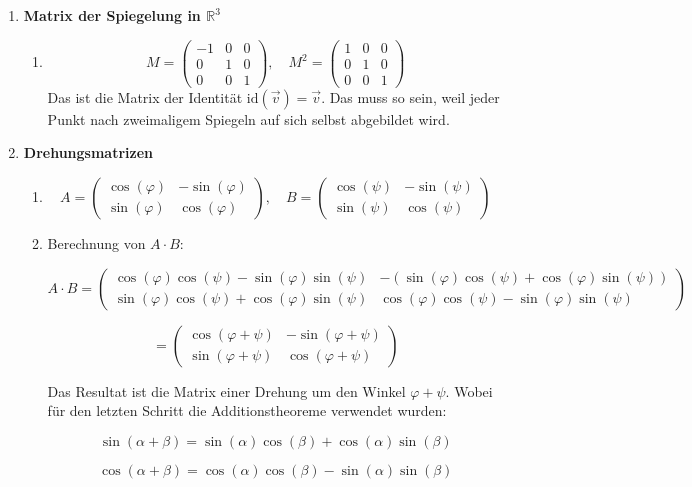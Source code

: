 \begin{enumerate}
    \item \textbf{Matrix der Spiegelung in \( \mathbb{R}^3 \)}
    \begin{enumerate}
        \item \[
        M = \begin{pmatrix} -1 & 0 & 0 \\ 0 & 1 & 0 \\ 0 & 0 & 1 \end{pmatrix}, 
        \quad M^2 = \begin{pmatrix} 1 & 0 & 0 \\ 0 & 1 & 0 \\ 0 & 0 & 1 \end{pmatrix}
        \]
        Das ist die Matrix der Identität \( \text{id}(\vec{v}) = \vec{v} \). Das muss so sein, weil jeder Punkt nach zweimaligem Spiegeln auf sich selbst abgebildet wird.
    \end{enumerate}

    \item \textbf{Drehungsmatrizen}
    \begin{enumerate}
        \item \[
        A = \begin{pmatrix} \cos(\varphi) & -\sin(\varphi) \\ \sin(\varphi) & \cos(\varphi) \end{pmatrix}, 
        \quad B = \begin{pmatrix} \cos(\psi) & -\sin(\psi) \\ \sin(\psi) & \cos(\psi) \end{pmatrix}
        \]

        \item Berechnung von \( A \cdot B \):

        \[
        A \cdot B =
        \begin{pmatrix} 
        \cos(\varphi) \cos(\psi) - \sin(\varphi) \sin(\psi) & -(\sin(\varphi) \cos(\psi) + \cos(\varphi) \sin(\psi)) \\ 
        \sin(\varphi) \cos(\psi) + \cos(\varphi) \sin(\psi) & \cos(\varphi) \cos(\psi) - \sin(\varphi) \sin(\psi) 
        \end{pmatrix}
        \]

        \[
        =
        \begin{pmatrix} \cos(\varphi + \psi) & -\sin(\varphi + \psi) \\ \sin(\varphi + \psi) & \cos(\varphi + \psi) \end{pmatrix}
        \]

        Das Resultat ist die Matrix einer Drehung um den Winkel \( \varphi + \psi \).  
        Wobei für den letzten Schritt die Additionstheoreme verwendet wurden:

        \[
        \sin(\alpha + \beta) = \sin(\alpha) \cos(\beta) + \cos(\alpha) \sin(\beta)
        \]
        
        \[
        \cos(\alpha + \beta) = \cos(\alpha) \cos(\beta) - \sin(\alpha) \sin(\beta)
        \]
    \end{enumerate}
\end{enumerate}
